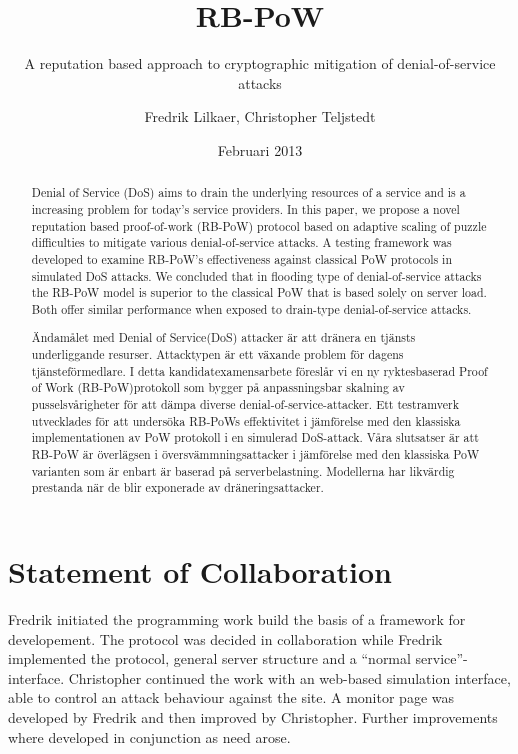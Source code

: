 \documentclass[a4paper,11pt]{kth-mag}
\title{RB-PoW}
\subtitle{A reputation based approach to cryptographic mitigation of denial-of-service attacks}
\author{Fredrik Lilkaer, Christopher Teljstedt}
\date{Februari 2013}
\begin{document}
\removepagenumbers
\maketitle 
{}
\newpage
\begin{abstract}
Denial of Service (DoS) aims to drain the underlying resources of a service and is a increasing problem for today's service providers. In this paper, we propose a novel reputation based proof-of-work (RB-PoW)  protocol based on adaptive scaling of puzzle difficulties to mitigate various denial-of-service attacks. A testing framework was developed to examine RB-PoW's effectiveness against classical PoW protocols in simulated DoS attacks. We concluded that in flooding type of denial-of-service attacks the RB-PoW model is superior to the classical PoW that is based solely on server load. Both offer similar performance when exposed to drain-type denial-of-service attacks. 
\end{abstract} 
\newpage

\renewcommand*\abstractname{Sammanfattning}
\begin{abstract}
Ändamålet med Denial of Service(DoS) attacker är att dränera en tjänsts underliggande resurser. Attacktypen är ett växande problem för dagens tjänsteförmedlare. I detta kandidatexamensarbete föreslår vi en ny ryktesbaserad Proof of Work (RB-PoW)protokoll som bygger på anpassningsbar skalning av pusselsvårigheter för att dämpa diverse denial-of-service-attacker. Ett testramverk utvecklades för att undersöka RB-PoWs effektivitet i jämförelse med den klassiska implementationen av PoW protokoll i en simulerad DoS-attack. Våra slutsatser är att RB-PoW är överlägsen i översvämmningsattacker i jämförelse med den klassiska PoW varianten som är enbart är baserad på serverbelastning. Modellerna har likvärdig prestanda när de blir exponerade av dräneringsattacker.  
\end{abstract} 
\newpage
\section*{Statement of Collaboration} 
Fredrik initiated the programming work build the basis of a framework for developement. The protocol was decided in collaboration while Fredrik implemented the protocol, general server structure and a ``normal service''- interface.
Christopher continued the work with an web-based simulation interface, able to control an attack behaviour against the site. A monitor page was developed by Fredrik and then improved by Christopher. Further improvements where developed in conjunction as need arose.
\end{document}
